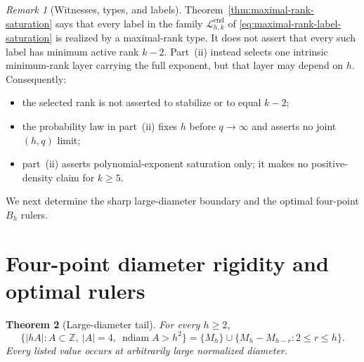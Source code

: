 \documentclass[11pt,reqno]{amsart}
\newtheorem{theorem}{Theorem}[section]
\theoremstyle{definition}
\theoremstyle{remark}
\newtheorem{remark}[theorem]{Remark}
\newcommand{\Z}{\mathbb Z}
\newcommand{\ndiam}{\operatorname{ndiam}}
\begin{document}
\begin{remark}[Witnesses, types, and labels]
\label{rem:maximal-rank-saturation-scope}
Theorem~\ref{thm:maximal-rank-saturation} says that every label in the family
$\mathcal L^{\mathrm{end}}_{h,k}$ of
\eqref{eq:maximal-rank-label-saturation} is realized by a maximal-rank type.
It does not assert that every such label has minimum active rank $k-2$.
Part~\textup{(ii)} instead selects one intrinsic minimum-rank layer carrying
the full exponent, but that layer may depend on $h$.  Consequently:
\begin{itemize}
\item the selected rank is not asserted to stabilize or to equal $k-2$;
\item the probability law in part~\textup{(ii)} fixes $h$ before
$q\to\infty$ and asserts no joint $(h,q)$ limit;
\item part~\textup{(ii)} asserts polynomial-exponent saturation only; it makes
no positive-density claim for $k\geq5$.
\end{itemize}
\end{remark}

We next determine the sharp large-diameter boundary and the optimal
four-point $B_h$ rulers.

\section{Four-point diameter rigidity and optimal rulers}
\label{sec:four-point-rigidity}

\begin{theorem}[Large-diameter tail]\label{thm:tail}
For every $h\geq2$,
\[
 \{|hA|:A\subset\Z,\ |A|=4,\ \ndiam A>h^2\}
 =\{M_h\}\cup\{M_h-M_{h-r}:2\leq r\leq h\}.
\]
Every listed value occurs at arbitrarily large normalized diameter.
\end{theorem}
\end{document}

